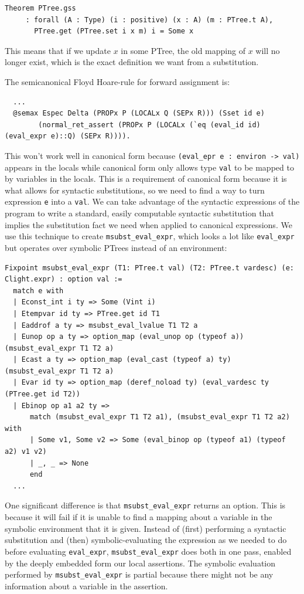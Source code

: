 \documentclass{puthesis}
\begin{document}
\begin{verbatim}
Theorem PTree.gss
     : forall (A : Type) (i : positive) (x : A) (m : PTree.t A),
       PTree.get (PTree.set i x m) i = Some x
\end{verbatim}

This means that if we update $x$ in some PTree, the old mapping of $x$
will no longer exist, which is the exact definition we want from a
substitution. 

The semicanonical Floyd Hoare-rule for forward assignment is:

\begin{lstlisting}
  ...
  @semax Espec Delta (PROPx P (LOCALx Q (SEPx R))) (Sset id e) 
        (normal_ret_assert (PROPx P (LOCALx (`eq (eval_id id) (eval_expr e)::Q) (SEPx R)))).
\end{lstlisting}

This won't work well in canonical form because 
\lstinline|(eval_epr e : environ -> val)| appears in the locals while canonical form only
allows type \lstinline|val| to be mapped to by variables in the
locals. This is a requirement of canonical form because it is what
allows for syntactic substitutions, so we need to find a way to turn
expression \lstinline|e| into a \lstinline|val|. We can take
advantage of the syntactic expressions of the program to write a standard, easily
computable syntactic substitution that implies the substitution fact
we need when applied to canonical expressions. We use this technique
to create \lstinline|msubst_eval_expr|, which looks a lot like
\lstinline|eval_expr| but operates over symbolic PTrees instead of an environment:

\begin{lstlisting}
Fixpoint msubst_eval_expr (T1: PTree.t val) (T2: PTree.t vardesc) (e: Clight.expr) : option val :=
  match e with
  | Econst_int i ty => Some (Vint i)
  | Etempvar id ty => PTree.get id T1
  | Eaddrof a ty => msubst_eval_lvalue T1 T2 a 
  | Eunop op a ty => option_map (eval_unop op (typeof a)) (msubst_eval_expr T1 T2 a) 
  | Ecast a ty => option_map (eval_cast (typeof a) ty) (msubst_eval_expr T1 T2 a)
  | Evar id ty => option_map (deref_noload ty) (eval_vardesc ty (PTree.get id T2))
  | Ebinop op a1 a2 ty =>
      match (msubst_eval_expr T1 T2 a1), (msubst_eval_expr T1 T2 a2) with
      | Some v1, Some v2 => Some (eval_binop op (typeof a1) (typeof a2) v1 v2) 
      | _, _ => None
      end
  ...
\end{lstlisting}

One significant difference is that \lstinline|msubst_eval_expr| returns
an option. This is because it will fail if it is unable to find a
mapping about a variable in the symbolic environment that it is
given. Instead of (first) performing a
syntactic substitution and (then) symbolic-evaluating the expression
as we needed to do before evaluating \lstinline|eval_expr|,
\lstinline|msubst_eval_expr| does both in one pass, enabled by the
deeply embedded form our local assertions.  The symbolic evaluation
performed by \lstinline|msubst_eval_expr| is partial because there
might not be any information about a variable in the assertion.
\end{document}
